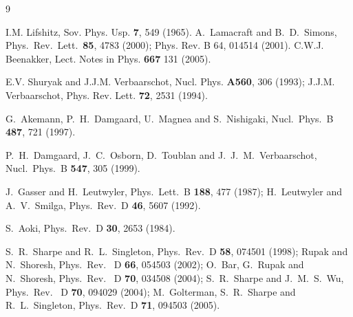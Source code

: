 \documentclass[aps,prl,twocolumn,superscriptaddress,preprintnumbers,floatfix,nofootinbib]{revtex4}
\begin{document}
\begin{thebibliography}{9}

I.M. Lifshitz, Sov. Phys. Usp. {\bf 7}, 549 (1965). 
A.~Lamacraft and B.~D.~Simons, 
Phys.\ Rev.\ Lett.\  {\bf 85}, 4783 (2000); Phys. Rev. B 64, 014514 (2001).
C.W.J. Beenakker,  Lect. Notes in Phys. {\bf 667} 131 (2005).

E.V. Shuryak and J.J.M. Verbaarschot, 
Nucl. Phys. {\bf A560}, 306 (1993); 
J.J.M. Verbaarschot, Phys. Rev. Lett. {\bf 72}, 2531 (1994).

G.~Akemann, P.~H.~Damgaard, U.~Magnea and S.~Nishigaki,
  Nucl.\ Phys.\  B {\bf 487}, 721 (1997).

  P.~H.~Damgaard, J.~C.~Osborn, D.~Toublan and J.~J.~M.~Verbaarschot,
  Nucl.\ Phys.\  B {\bf 547}, 305 (1999).

J.~Gasser and H.~Leutwyler,
  Phys.\ Lett.\  B {\bf 188}, 477 (1987);
H.~Leutwyler and A.~V.~Smilga,
  Phys.\ Rev.\  D {\bf 46}, 5607 (1992).

  S.~Aoki,
  Phys.\ Rev.\  D {\bf 30}, 2653 (1984).

S.~R.~Sharpe and R.~L.~Singleton,
  Phys.\ Rev.\  D {\bf 58}, 074501 (1998);
Rupak and N.~Shoresh,
Phys.\ Rev. \ D {\bf 66}, 054503 (2002);
O.~Bar, G.~Rupak and N.~Shoresh,
Phys.\ Rev. \ D {\bf 70}, 034508 (2004);
S.~R.~Sharpe and J.~M.~S.~Wu,
  Phys.\ Rev. \ D {\bf 70}, 094029 (2004);
M.~Golterman, S.~R.~Sharpe and R.~L.~Singleton,
  Phys.\ Rev.\  D {\bf 71}, 094503 (2005).



\end{thebibliography}
\end{document}
